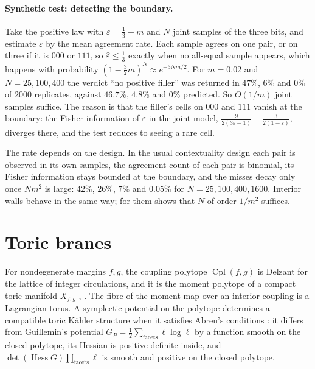 \documentclass[11pt]{article}
\theoremstyle{definition}
\theoremstyle{remark}
\newcommand{\Cpl}{\operatorname{Cpl}}
\newcommand{\Hess}{\operatorname{Hess}}
\begin{document}
\paragraph{Synthetic test: detecting the boundary.} Take the positive law with $\varepsilon=\frac13+m$ and $N$ joint samples of the three bits,
and estimate $\varepsilon$ by the mean agreement rate. Each sample agrees on one pair, or on three if it is $000$ or $111$, so $\hat\varepsilon\le\frac13$
exactly when no all-equal sample appears, which happens with probability $(1-\frac32m)^N\approx e^{-3Nm/2}$. For $m=0.02$ and $N=25,100,400$ the
verdict ``no positive filler'' was returned in $47\%$, $6\%$ and $0\%$ of $2000$ replicates, against $46.7\%$, $4.8\%$ and $0\%$ predicted. So
$O(1/m)$ joint samples suffice. The reason is that the filler's cells on $000$ and $111$ vanish at the boundary: the Fisher information of
$\varepsilon$ in the joint model, $\frac9{2(3\varepsilon-1)}+\frac3{2(1-\varepsilon)}$, diverges there, and the test reduces to seeing a rare cell.

The rate depends on the design. In the usual contextuality design each pair is observed in its own samples, the agreement count of each
pair is binomial, its Fisher information stays bounded at the boundary, and the misses decay only once $Nm^2$ is large: $42\%$, $26\%$, $7\%$
and $0.05\%$ for $N=25,100,400,1600$. Interior walls behave in the same way; for them \cite[Prop.~12.2]{Conditionals} shows that $N$ of order
$1/m^2$ suffices.

\section{Toric branes}\label{sec:toric}

For nondegenerate margins $f,g$, the coupling polytope $\Cpl(f,g)$ is Delzant for the lattice of integer circulations, and it is
the moment polytope of a compact toric manifold $X_{f,g}$ \cite[Thm.~6.4]{Conditionals}, \cite{Delzant1988}. The fibre of the moment
map over an interior coupling is a Lagrangian torus. A symplectic potential on the polytope determines a compatible toric
Kähler structure when it satisfies Abreu's conditions \cite{Abreu2003}: it differs from Guillemin's potential
$G_P=\frac12\sum_{\text{facets}}\ell\log\ell$ \cite{Guillemin1994} by a function smooth on the closed polytope, its Hessian is
positive definite inside, and $\det(\Hess G)\prod_{\text{facets}}\ell$ is smooth and positive on the closed polytope.
\end{document}
